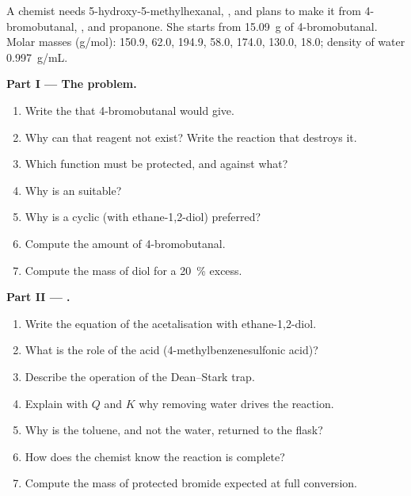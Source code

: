 \begin{problem}
\label{pb:b1:acetals-protection:1}
A chemist needs 5-hydroxy-5-methylhexanal, , and
plans to make it from 4-bromobutanal, , and propanone.
She starts from \qty{15.09}{g} of 4-bromobutanal. Molar masses
(\unit{g/mol}):  150.9,  62.0,  194.9,
 58.0,  174.0,  130.0,  18.0;
density of water \qty{0.997}{g/mL}.

\medskip
\noindent\textbf{Part I --- The problem.}
\begin{enumerate}
  \item Write the  that 4-bromobutanal would give.
  \item Why can that reagent not exist? Write the reaction that destroys
        it.
  \item Which function must be protected, and against what?
  \item Why is an  suitable?
  \item Why is a cyclic  (with ethane-1,2-diol) preferred?
  \item Compute the amount of 4-bromobutanal.
  \item Compute the mass of diol for a \qty{20}{\percent} excess.
\end{enumerate}

\medskip
\noindent\textbf{Part II --- .}
\begin{enumerate}[resume]
  \item Write the equation of the acetalisation with ethane-1,2-diol.
  \item What is the role of the acid  (4-methylbenzenesulfonic
        acid)?
  \item Describe the operation of the Dean--Stark trap.
  \item Explain with $Q$ and $K$ why removing water drives the reaction.
  \item Why is the toluene, and not the water, returned to the flask?
  \item How does the chemist know the reaction is complete?
  \item Compute the mass of protected bromide expected at full conversion.
\end{enumerate}


\end{problem}
